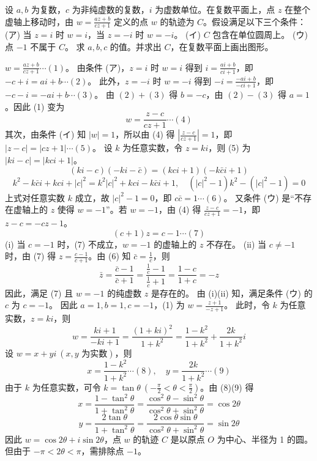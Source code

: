 \begin{questions}
\question
设 $a, b$ 为复数，$c$ 为非纯虚数的复数，$i$ 为虚数单位。在复数平面上，点 $z$ 在整个虚轴上移动时，由 $w = \frac{az + b}{cz + 1}$ 定义的点 $w$ 的轨迹为 $C$。假设满足以下三个条件：
(ア) 当 $z = i$ 时 $w = i$，当 $z = -i$ 时 $w = -i$。
(イ) $C$ 包含在单位圆周上。
(ウ) 点 $-1$ 不属于 $C$。
求 $a, b, c$ 的值。并求出 $C$，在复数平面上画出图形。
\begin{solution}
$w = \frac{az + b}{cz + 1} \cdots (1)$。
由条件 (ア)，$z = i$ 时 $w = i$ 得到 $i = \frac{ai + b}{ci + 1}$，即 $-c + i = ai + b \cdots (2)$。
此外，$z = -i$ 时 $w = -i$ 得到 $-i = \frac{-ai + b}{-ci + 1}$，即 $-c - i = -ai + b \cdots (3)$。
由 $(2) + (3)$ 得 $b = -c$，由 $(2) - (3)$ 得 $a = 1$。因此 (1) 变为
\[
w = \frac{z - c}{cz + 1} \cdots (4)
\]
其次，由条件 (イ) 知 $|w| = 1$，所以由 (4) 得 $\left| \frac{z - c}{cz + 1} \right| = 1$，即 $|z - c| = |cz + 1| \cdots (5)$。
设 $k$ 为任意实数，令 $z = ki$，则 (5) 为 $|ki - c| = |kci + 1|$。
\[
(ki - c)(-ki - \bar{c}) = (kci + 1)(-k\bar{c}i + 1)
\]
\[
k^2 - k\bar{c}i + kci + |c|^2 = k^2|c|^2 + kci - k\bar{c}i + 1, \quad (|c|^2 - 1)k^2 - (|c|^2 - 1) = 0
\]
上式对任意实数 $k$ 成立，故 $|c|^2 - 1 = 0$，即 $c\bar{c} = 1 \cdots (6)$。
又条件 (ウ) 是“不存在虚轴上的 $z$ 使得 $w = -1$”。若 $w = -1$，由 (4) 得 $\frac{z - c}{cz + 1} = -1$，即 $z - c = -cz - 1$。
\[
(c + 1)z = c - 1 \cdots (7)
\]
(i) 当 $c = -1$ 时，(7) 不成立，$w = -1$ 的虚轴上的 $z$ 不存在。
(ii) 当 $c \neq -1$ 时，由 (7) 得 $z = \frac{c - 1}{c + 1}$。由 (6) 知 $\bar{c} = \frac{1}{c}$，则
\[
\bar{z} = \frac{\bar{c} - 1}{\bar{c} + 1} = \frac{\frac{1}{c} - 1}{\frac{1}{c} + 1} = \frac{1 - c}{1 + c} = -z
\]
因此，满足 (7) 且 $w = -1$ 的纯虚数 $z$ 是存在的。
由 (i)(ii) 知，满足条件 (ウ) 的 $c$ 为 $c = -1$。
因此 $a = 1, b = 1, c = -1$，(1) 为 $w = \frac{z + 1}{-z + 1}$。
此时，令 $k$ 为任意实数，$z = ki$，则
\[
w = \frac{ki + 1}{-ki + 1} = \frac{(1 + ki)^2}{1 + k^2} = \frac{1 - k^2}{1 + k^2} + \frac{2k}{1 + k^2}i
\]
设 $w = x + yi \ (x, y \text{ 为实数})$，则
\[
x = \frac{1 - k^2}{1 + k^2} \cdots (8), \quad y = \frac{2k}{1 + k^2} \cdots (9)
\]
由于 $k$ 为任意实数，可令 $k = \tan \theta \ \left( -\frac{\pi}{2} < \theta < \frac{\pi}{2} \right)$。由 (8)(9) 得
\[
x = \frac{1 - \tan^2 \theta}{1 + \tan^2 \theta} = \frac{\cos^2 \theta - \sin^2 \theta}{\cos^2 \theta + \sin^2 \theta} = \cos 2\theta
\]
\[
y = \frac{2 \tan \theta}{1 + \tan^2 \theta} = \frac{2 \cos \theta \sin \theta}{\cos^2 \theta + \sin^2 \theta} = \sin 2\theta
\]
因此 $w = \cos 2\theta + i \sin 2\theta$，点 $w$ 的轨迹 $C$ 是以原点 $O$ 为中心、半径为 1 的圆。但由于 $-\pi < 2\theta < \pi$，需排除点 $-1$。
\end{solution}


\end{questions}
